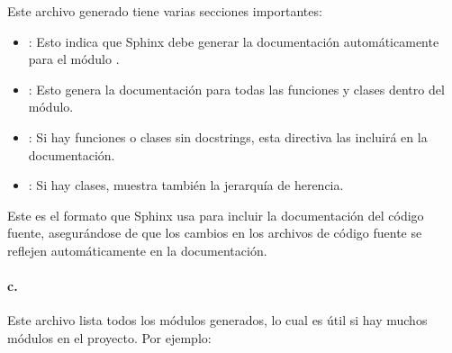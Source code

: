 \documentclass[a4paper,10pt,spanish]{sphinxmanual}
\begin{document}
\sphinxAtStartPar
Este archivo generado tiene varias secciones importantes:
\begin{itemize}
\item {} 
\sphinxAtStartPar
{}: Esto indica que Sphinx debe generar la documentación automáticamente para el módulo .

\item {} 
\sphinxAtStartPar
{}: Esto genera la documentación para todas las funciones y clases dentro del módulo.

\item {} 
\sphinxAtStartPar
{}: Si hay funciones o clases sin docstrings, esta directiva las incluirá en la documentación.

\item {} 
\sphinxAtStartPar
{}: Si hay clases, muestra también la jerarquía de herencia.

\end{itemize}

\sphinxAtStartPar
Este es el formato que Sphinx usa para incluir la documentación del código fuente, asegurándose de que los cambios en los archivos de código fuente se reflejen automáticamente en la documentación.


\paragraph{c. }
\label{\detokenize{configuracion_inicial/007.Creacion_de_ficheros_de_codigo_y_generacion_automatica_de_documentacion:c-modules-rst-o-modules-md}}
\sphinxAtStartPar
Este archivo lista todos los módulos generados, lo cual es útil si hay muchos módulos en el proyecto. Por ejemplo:

\begin{sphinxVerbatim}[commandchars=\\\{\}]

 
    



\end{sphinxVerbatim}
\end{document}
